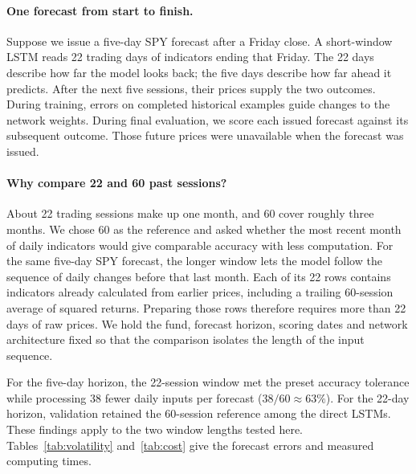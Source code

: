 \documentclass[11pt]{article}
\begin{document}
\paragraph{One forecast from start to finish.} Suppose we issue a five-day SPY forecast after a Friday close. A short-window LSTM reads 22 trading days of indicators ending that Friday. The 22 days describe how far the model looks back; the five days describe how far ahead it predicts. After the next five sessions, their prices supply the two outcomes. During training, errors on completed historical examples guide changes to the network weights. During final evaluation, we score each issued forecast against its subsequent outcome. Those future prices were unavailable when the forecast was issued.

\paragraph{Why compare 22 and 60 past sessions?} About 22 trading sessions make up one month, and 60 cover roughly three months. We chose 60 as the reference and asked whether the most recent month of daily indicators would give comparable accuracy with less computation. For the same five-day SPY forecast, the longer window lets the model follow the sequence of daily changes before that last month. Each of its 22 rows contains indicators already calculated from earlier prices, including a trailing 60-session average of squared returns. Preparing those rows therefore requires more than 22 days of raw prices. We hold the fund, forecast horizon, scoring dates and network architecture fixed so that the comparison isolates the length of the input sequence.

For the five-day horizon, the 22-session window met the preset accuracy tolerance while processing 38 fewer daily inputs per forecast ($38/60 \approx 63\%$). For the 22-day horizon, validation retained the 60-session reference among the direct LSTMs. These findings apply to the two window lengths tested here. Tables~\ref{tab:volatility} and~\ref{tab:cost} give the forecast errors and measured computing times.
\end{document}
